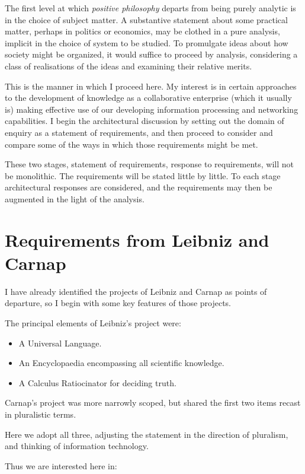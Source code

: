 The first level at which \emph{positive philosophy} departs from being
purely analytic is in the choice of subject matter.
A substantive statement about some practical matter, perhaps in
politics or economics, may be clothed in a pure analysis, implicit in
the choice of system to be studied.
To promulgate ideas about how society might be organized, it would
suffice to proceed by analysis, considering a class of realisations of
the ideas and examining their relative merits.

This is the manner in which I proceed here.
My interest is in certain approaches to the development of knowledge
as a collaborative enterprise (which it usually is) making effective use
of our developing information processing and networking capabilities.
I begin the architectural discussion by setting out the domain of
enquiry as a statement of requirements, and then proceed to consider
and compare some of the ways in which those requirements might be met.

These two stages, statement of requirements, response to requirements,
will not be monolithic.
The requirements will be stated little by little.
To each stage architectural responses are considered, and the
requirements may then be augmented in the light of the analysis.

\section{Requirements from Leibniz and Carnap}

I have already identified the projects of Leibniz and Carnap as points
of departure, so I begin with some key features of those projects.

The principal elements of Leibniz's project were:

\begin{itemize}
\item A Universal Language.
\item An Encyclopaedia encompassing all scientific knowledge.
\item A Calculus Ratiocinator for deciding truth.
\end{itemize}

Carnap's project was more narrowly scoped, but shared the first two
items recast in pluralistic terms.

Here we adopt all three, adjusting the statement in the direction of
pluralism, and thinking of information technology.

Thus we are interested here in:

